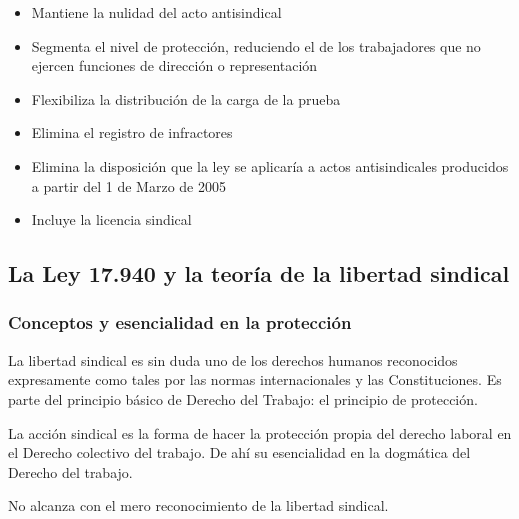 \documentclass[spanish,12pt,a4paper,titlepage]{report}
\begin{document}
\begin{itemize}
\item Mantiene la nulidad del acto antisindical
\item Segmenta el nivel de protección, reduciendo el de los trabajadores que no ejercen funciones de dirección o representación
\item Flexibiliza la distribución de la carga  de la prueba
\item Elimina el registro de infractores
\item Elimina la disposición que la ley se aplicaría a actos antisindicales producidos a partir del 1 de Marzo de 2005
\item Incluye la licencia sindical
\end{itemize}

\subsection{La Ley 17.940 y la teoría de la libertad sindical}
\subsubsection{Conceptos y esencialidad en la protección}

La libertad sindical es sin duda uno de los derechos humanos reconocidos expresamente como tales por las normas internacionales y las Constituciones. Es parte del principio básico de Derecho del Trabajo: el principio de protección. 

La acción sindical es la forma de hacer la protección propia del derecho laboral en el Derecho colectivo del trabajo. De ahí su esencialidad en la dogmática del Derecho del trabajo.

No  alcanza con el mero reconocimiento de la libertad sindical.
\end{document}

